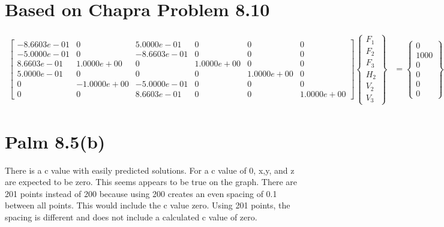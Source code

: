 \documentclass{article}
\begin{document}
\section{Based on Chapra Problem 8.10}
\renewcommand*{\arraystretch}{0.5}
\begin{align*}
\begin{bmatrix}
-8.6603e-01 & 0 & 5.0000e-01 & 0 & 0 & 0\\
-5.0000e-01 & 0 & -8.6603e-01 & 0 & 0 & 0\\
8.6603e-01 & 1.0000e+00 & 0 & 1.0000e+00 & 0 & 0\\
5.0000e-01 & 0 & 0 & 0 & 1.0000e+00 & 0\\
0 & -1.0000e+00 & -5.0000e-01 & 0 & 0 & 0\\
0 & 0 & 8.6603e-01 & 0 & 0 & 1.0000e+00
\end{bmatrix}
\begin{Bmatrix}
F_1\\F_2\\F_3\\H_2\\V_2\\V_3
\end{Bmatrix}&=
\begin{Bmatrix}
0\\1000\\0\\0\\0\\0
\end{Bmatrix}
\end{align*}


\section{Palm 8.5(b)}
There is a c value with easily predicted solutions. For a c value of 0, x,y, and z are expected to be zero. This seems appears to be true on the graph.
There are 201 points instead of 200 because using 200 creates an even spacing of 0.1 between all points. This would include the c value zero. Using 201 points, the spacing is different and does not include a calculated c value of zero.
\end{document}
